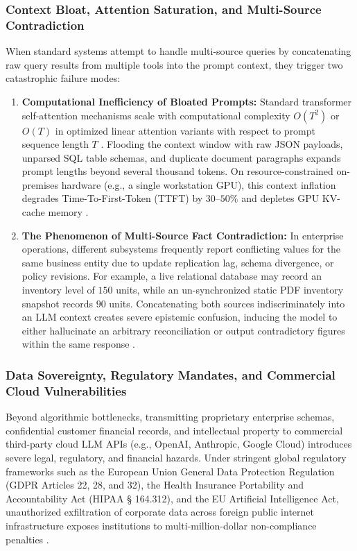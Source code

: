 \subsubsection{Context Bloat, Attention Saturation, and Multi-Source Contradiction}
When standard systems attempt to handle multi-source queries by concatenating raw query results from multiple tools into the prompt context, they trigger two catastrophic failure modes:
\begin{enumerate}
    \item \textbf{Computational Inefficiency of Bloated Prompts:} Standard transformer self-attention mechanisms scale with computational complexity $O(T^2)$ or $O(T)$ in optimized linear attention variants with respect to prompt sequence length $T$ \cite{vaswani2017attention,dao2022flashattention}. Flooding the context window with raw JSON payloads, unparsed SQL table schemas, and duplicate document paragraphs expands prompt lengths beyond several thousand tokens. On resource-constrained on-premises hardware (e.g., a single workstation GPU), this context inflation degrades Time-To-First-Token (TTFT) by $30\text{--}50\%$ and depletes GPU KV-cache memory \cite{liu2024lost_in_the_middle}.
    \item \textbf{The Phenomenon of Multi-Source Fact Contradiction:} In enterprise operations, different subsystems frequently report conflicting values for the same business entity due to update replication lag, schema divergence, or policy revisions. For example, a live relational database may record an inventory level of $150$ units, while an un-synchronized static PDF inventory snapshot records $90$ units. Concatenating both sources indiscriminately into an LLM context creates severe epistemic confusion, inducing the model to either hallucinate an arbitrary reconciliation or output contradictory figures within the same response \cite{chen2023frugalgpt,min2023factscore}.
\end{enumerate}

\subsubsection{Data Sovereignty, Regulatory Mandates, and Commercial Cloud Vulnerabilities}
Beyond algorithmic bottlenecks, transmitting proprietary enterprise schemas, confidential customer financial records, and intellectual property to commercial third-party cloud LLM APIs (e.g., OpenAI, Anthropic, Google Cloud) introduces severe legal, regulatory, and financial hazards. Under stringent global regulatory frameworks such as the European Union General Data Protection Regulation (GDPR Articles 22, 28, and 32), the Health Insurance Portability and Accountability Act (HIPAA § 164.312), and the EU Artificial Intelligence Act, unauthorized exfiltration of corporate data across foreign public internet infrastructure exposes institutions to multi-million-dollar non-compliance penalties \cite{voigt2017eu_gdpr}. 

